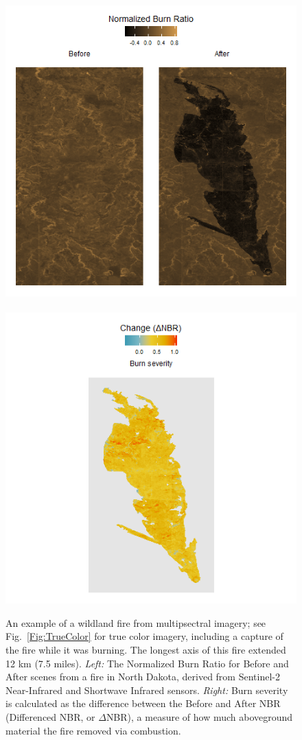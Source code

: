 \documentclass[fire,article,submit,oneauthor,pdftex]{Definitions/mdpi}
\begin{document}
\begin{figure}[t]
	\centering
	\includegraphics[width=0.72\columnwidth, trim={10 0 0 0},clip]{nbr_gg.png}~
	\includegraphics[width=0.28\columnwidth, trim={150 0 150 0},clip]{dnbr_gg.png}

	\caption{An example of a wildland fire from multipsectral imagery; 	see Fig.~\ref{Fig:TrueColor} for true color imagery, including a capture of the fire while it was burning.
		The longest axis of this fire extended 12 km (7.5 miles).
				\emph{Left:} The Normalized Burn Ratio for Before and After scenes from a fire in North Dakota, derived from Sentinel-2 Near-Infrared and Shortwave Infrared sensors.
		\emph{Right:} Burn severity is calculated as the difference between the Before and After NBR (Differenced NBR, or $\Delta$NBR), a measure of how much aboveground material the fire removed via combustion.
 }
	\label{Fig:NBRexample} %
\end{figure}
\end{document}
